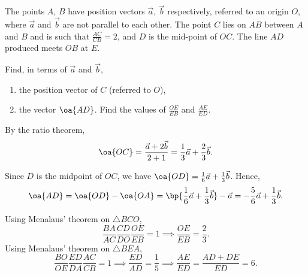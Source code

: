 \begin{problem}
    The points $A$, $B$ have position vectors $\vec a$, $\vec b$ respectively, referred to an origin $O$, where $\vec a$ and $\vec b$ are not parallel to each other. The point $C$ lies on $AB$ between $A$ and $B$ and is such that $\frac{AC}{CB} = 2$, and $D$ is the mid-point of $OC$. The line $AD$ produced meets $OB$ at $E$.

    Find, in terms of $\vec a$ and $\vec b$,

    \begin{enumerate}
        \item the position vector of $C$ (referred to $O$),
        \item the vector $\oa{AD}$. Find the values of $\frac{OE}{EB}$ and $\frac{AE}{ED}$.
    \end{enumerate}
\end{problem}
\begin{solution}
    \begin{ppart}
        By the ratio theorem, \[\oa{OC} = \frac{\vec a + 2\vec b}{2 + 1} = \frac13 \vec a + \frac23 \vec b.\]
    \end{ppart}
    \begin{ppart}
        Since $D$ is the midpoint of $OC$, we have $\oa{OD} = \frac16 \vec a + \frac13 \vec b$. Hence, \[\oa{AD} = \oa{OD} - \oa{OA} = \bp{\frac16 \vec a + \frac13 \vec b} - \vec a = -\frac56 \vec a + \frac13 \vec b.\]
        
        Using Menalaus' theorem on $\triangle BCO$, \[\frac{BA}{AC} \frac{CD}{DO} \frac{OE}{EB} = 1 \implies \frac{OE}{EB} = \frac23.\] Using Menalaus' theorem on $\triangle BEA$, \[\frac{BO}{OE} \frac{ED}{DA} \frac{AC}{CB} = 1 \implies \frac{ED}{AD} = \frac15 \implies \frac{AE}{ED} = \frac{AD + DE}{ED} = 6.\]
    \end{ppart}
\end{solution}

